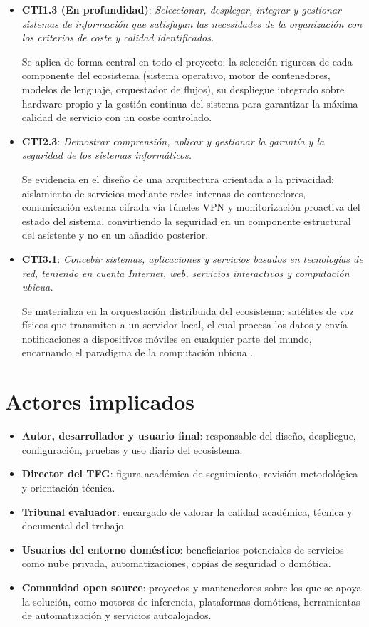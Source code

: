 \begin{itemize}

  \item \textbf{CTI1.3 (En profundidad)}: \textit{Seleccionar, desplegar, integrar y gestionar sistemas de información que satisfagan las necesidades de la organización con los criterios de coste y calidad identificados.}

  Se aplica de forma central en todo el proyecto: la selección rigurosa de cada componente del ecosistema (sistema operativo, motor de contenedores, modelos de lenguaje, orquestador de flujos), su despliegue integrado sobre hardware propio y la gestión continua del sistema para garantizar la máxima calidad de servicio con un coste controlado.

  \item \textbf{CTI2.3}: \textit{Demostrar comprensión, aplicar y gestionar la garantía y la seguridad de los sistemas informáticos.}

  Se evidencia en el diseño de una arquitectura orientada a la privacidad: aislamiento de servicios mediante redes internas de contenedores, comunicación externa cifrada vía túneles VPN y monitorización proactiva del estado del sistema, convirtiendo la seguridad en un componente estructural del asistente y no en un añadido posterior.

  \item \textbf{CTI3.1}: \textit{Concebir sistemas, aplicaciones y servicios basados en tecnologías de red, teniendo en cuenta Internet, web, servicios interactivos y computación ubicua.}

  Se materializa en la orquestación distribuida del ecosistema: satélites de voz físicos que transmiten a un servidor local, el cual procesa los datos y envía notificaciones a dispositivos móviles en cualquier parte del mundo, encarnando el paradigma de la computación ubicua \cite{weiser1991computer}.

\end{itemize}

\section{Actores implicados}
\begin{itemize}
  \item \textbf{Autor, desarrollador y usuario final}: responsable del diseño, despliegue, configuración, pruebas y uso diario del ecosistema.
  \item \textbf{Director del TFG}: figura académica de seguimiento, revisión metodológica y orientación técnica.
  \item \textbf{Tribunal evaluador}: encargado de valorar la calidad académica, técnica y documental del trabajo.
  \item \textbf{Usuarios del entorno doméstico}: beneficiarios potenciales de servicios como nube privada, automatizaciones, copias de seguridad o domótica.
  \item \textbf{Comunidad open source}: proyectos y mantenedores sobre los que se apoya la solución, como motores de inferencia, plataformas domóticas, herramientas de automatización y servicios autoalojados.
\end{itemize}
